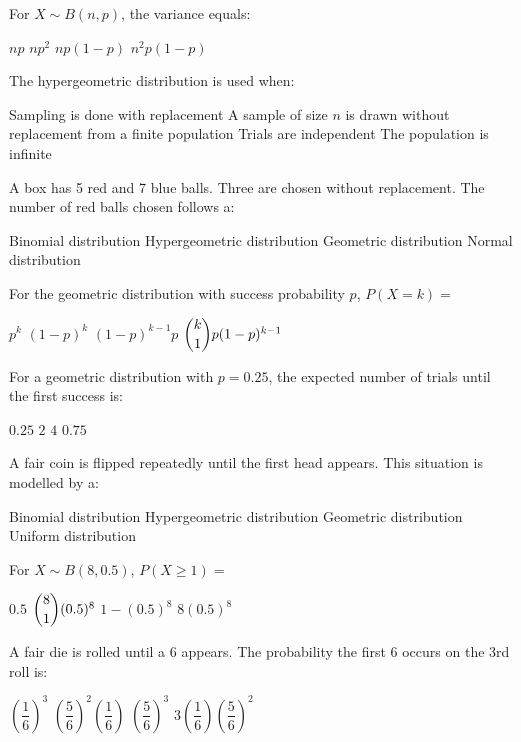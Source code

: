 \documentclass[addpoints]{exam}
\begin{document}
\begin{questions}
\question[1] For $X \sim B(n, p)$, the variance equals:
\begin{choices}
    \choice $np$
    \choice $np^2$
    \correctchoice $np(1-p)$
    \choice $n^2p(1-p)$
\end{choices}

\question[1] The hypergeometric distribution is used when:
\begin{choices}
    \choice Sampling is done with replacement
    \correctchoice A sample of size $n$ is drawn without replacement from a finite population
    \choice Trials are independent
    \choice The population is infinite
\end{choices}

\question[1] A box has 5 red and 7 blue balls. Three are chosen without replacement.
The number of red balls chosen follows a:
\begin{choices}
    \choice Binomial distribution
    \correctchoice Hypergeometric distribution
    \choice Geometric distribution
    \choice Normal distribution
\end{choices}

\question[1] For the geometric distribution with success probability $p$,
$P(X = k) =$
\begin{choices}
    \choice $p^k$
    \choice $(1-p)^k$
    \correctchoice $(1-p)^{k-1}p$
    \choice $\dbinom{k}{1}p(1-p)^{k-1}$
\end{choices}

\question[1] For a geometric distribution with $p = 0.25$, the expected number of
trials until the first success is:
\begin{choices}
    \choice $0.25$
    \choice $2$
    \correctchoice $4$
    \choice $0.75$
\end{choices}

\question[1] A fair coin is flipped repeatedly until the first head appears.
This situation is modelled by a:
\begin{choices}
    \choice Binomial distribution
    \choice Hypergeometric distribution
    \correctchoice Geometric distribution
    \choice Uniform distribution
\end{choices}

\question[1] For $X \sim B(8, 0.5)$, $P(X \geq 1) =$
\begin{choices}
    \choice $0.5$
    \choice $\dbinom{8}{1}(0.5)^8$
    \correctchoice $1 - (0.5)^8$
    \choice $8(0.5)^8$
\end{choices}

\question[1] A fair die is rolled until a 6 appears. The probability the first 6 occurs
on the 3rd roll is:
\begin{choices}
    \choice $\left(\dfrac{1}{6}\right)^3$
    \correctchoice $\left(\dfrac{5}{6}\right)^2\!\left(\dfrac{1}{6}\right)$
    \choice $\left(\dfrac{5}{6}\right)^3$
    \choice $3\left(\dfrac{1}{6}\right)\!\left(\dfrac{5}{6}\right)^2$
\end{choices}


\end{questions}
\end{document}
